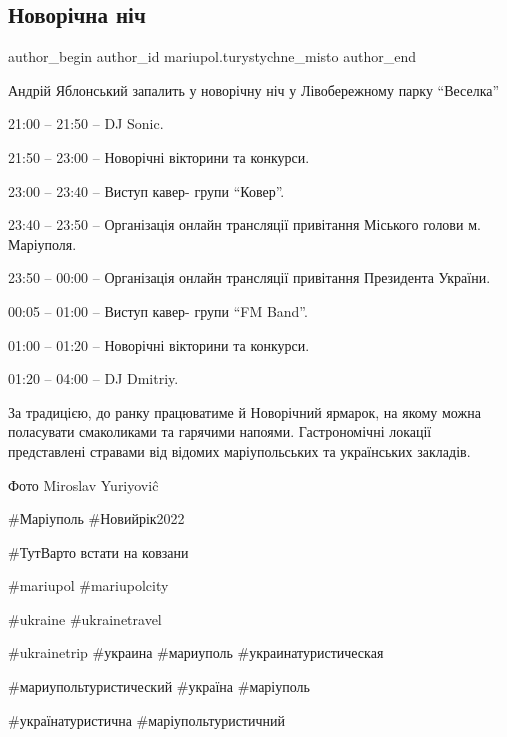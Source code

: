  
 
 
 
 

\subsection{Новорічна ніч}
\label{sec:30_12_2021.fb.mariupol.turystychne_misto.1.novorichna_nich}

\ifcmt
 author_begin
   author_id mariupol.turystychne_misto
 author_end
\fi

Андрій Яблонський запалить у новорічну ніч у Лівобережному парку \enquote{Веселка}

21:00 – 21:50 – DJ Sonic.\par
21:50 – 23:00 – Новорічні вікторини та конкурси.\par
23:00 – 23:40 – Виступ кавер- групи \enquote{Ковер}.\par
23:40 – 23:50 – Організація онлайн трансляції привітання Міського голови м. Маріуполя.\par
23:50 – 00:00 – Організація онлайн трансляції привітання Президента України.\par
00:05 – 01:00 – Виступ кавер- групи \enquote{FM Band}.\par
01:00 – 01:20 – Новорічні вікторини та конкурси.\par
01:20 – 04:00 – DJ Dmitriy.\par

За традицією, до ранку працюватиме й Новорічний ярмарок, на якому можна
поласувати смаколиками та гарячими напоями. Гастрономічні локації представлені
стравами від відомих маріупольських та українських закладів.

Фото Miroslav Yuriyoviĉ

\#Маріуполь \#Новийрік2022 

\#ТутВарто встати на ковзани 

\#mariupol \#mariupolcity

\#ukraine \#ukrainetravel 

\#ukrainetrip \#украина  \#мариуполь \#украинатуристическая

\#мариупольтуристический  \#україна \#маріуполь 

\#українатуристична \#маріупольтуристичний
